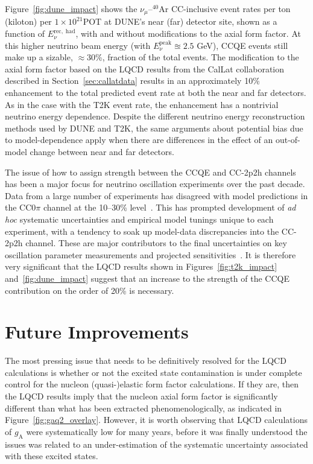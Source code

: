 \documentclass{ar-1col}
\begin{document}
Figure~\ref{fig:dune_impact} shows the $\nu_{\mu}$--$^{40}$Ar CC-inclusive event rates per ton (kiloton) per $1\times10^{21}$POT at DUNE's near (far) detector site, shown as a function of $E^{\mathrm{rec,\;had}}_{\nu}$, with and without modifications to the axial form factor. At this higher neutrino beam energy (with $E_{\nu}^{\mathrm{peak}} \approxeq 2.5$ GeV), CCQE events still make up a sizable, $\approx$30\%, fraction of the total events.
The modification to the axial form factor based on the LQCD results from the CalLat collaboration described in Section~\ref{sec:callatdata} results in an approximately 10\% enhancement to the total predicted event rate at both the near and far detectors. As in the case with the T2K event rate, the enhancement has a nontrivial neutrino energy dependence.
Despite the different neutrino energy reconstruction methods used by DUNE and T2K, the same arguments about potential bias due to model-dependence apply when there are differences in the effect of an out-of-model change between near and far detectors.

The issue of how to assign strength between the CCQE and CC-2p2h channels has been a major focus for neutrino oscillation experiments over the past decade.
Data from a large number of experiments has disagreed with model predictions in the CC$0\pi$ channel at the 10--30\% level~\cite{garvey_review_2014, Mosel:2016cwa, NuSTEC:2017hzk, Katori:2016yel, ParticleDataGroup:2020ssz}. This has prompted development of {\it ad hoc} systematic uncertainties and empirical model tunings unique to each experiment, with a tendency to soak up model-data discrepancies into the CC-2p2h channel.
These are major contributors to the final uncertainties on key oscillation parameter measurements and projected sensitivities~\cite{T2K:2019bcf, DUNE:2020jqi, T2K:2021xwb, NOvA:2021nfi, DUNE:2021mtg}. It is therefore very significant that the LQCD results shown in Figures~\ref{fig:t2k_impact} and~\ref{fig:dune_impact} suggest that an increase to the strength of the CCQE contribution on the order of 20\% is necessary.


\section{Future Improvements\label{sec:future}}

The most pressing issue that needs to be definitively resolved for the LQCD calculations is whether or not the excited state contamination is under complete control for the nucleon (quasi-)elastic form factor calculations.
If they are, then the LQCD results imply that the nucleon axial form factor is significantly different than what has been extracted phenomenologically, as indicated in Figure~\ref{fig:gaq2_overlay}.
However, it is worth observing that LQCD calculations of $g_{\mathrm{A}}$ were systematically low for many years, before it was finally understood the issues was related to an under-estimation of the systematic uncertainty associated with these excited states.
\end{document}
